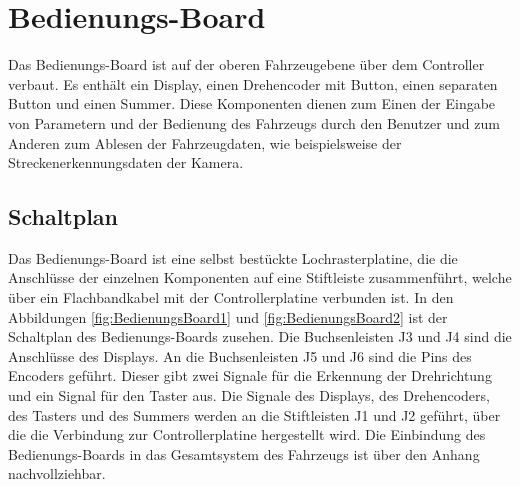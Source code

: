 

\pagestyle{fancy}
\rhead{\thepage} \chead{} 
\cfoot{}

\section{Bedienungs-Board}\label{Sec6}

Das Bedienungs-Board ist auf der oberen Fahrzeugebene über dem Controller verbaut. Es enthält ein Display, einen Drehencoder mit Button, einen separaten Button und einen Summer. Diese Komponenten dienen zum Einen der Eingabe von Parametern und der Bedienung des Fahrzeugs durch den Benutzer und zum Anderen zum Ablesen der Fahrzeugdaten, wie beispielsweise der Streckenerkennungsdaten der Kamera.

\subsection{Schaltplan}\label{Sec6Sub1}

Das Bedienungs-Board ist eine selbst bestückte Lochrasterplatine, die die Anschlüsse der einzelnen Komponenten auf eine Stiftleiste zusammenführt, welche über ein Flachbandkabel mit der Controllerplatine verbunden ist. In den Abbildungen \ref{fig:BedienungsBoard1} und \ref{fig:BedienungsBoard2} ist der Schaltplan des Bedienungs-Boards zusehen. Die Buchsenleisten J3 und J4 sind die Anschlüsse des Displays. An die Buchsenleisten J5 und J6 sind die Pins des Encoders geführt. Dieser gibt zwei Signale für die Erkennung der Drehrichtung und ein Signal für den Taster aus. Die Signale des Displays, des Drehencoders, des Tasters und des Summers werden an die Stiftleisten J1 und J2 geführt, über die die Verbindung zur Controllerplatine hergestellt wird. Die Einbindung des Bedienungs-Boards in das Gesamtsystem des Fahrzeugs ist über den Anhang \glqq{}\grqq{} nachvollziehbar.

